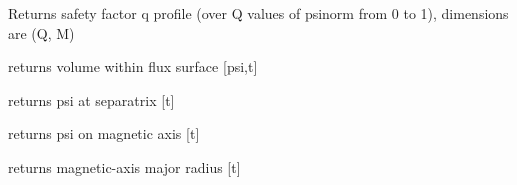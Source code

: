 \documentclass[letterpaper,10pt,english]{sphinxmanual}
\begin{document}
\begin{fulllineitems}
\begin{fulllineitems}
\end{fulllineitems}


\begin{fulllineitems}
\label{eqtools:eqtools.FromArrays.ArrayEquilibrium.getQProfile}
Returns safety factor q profile (over Q values of psinorm from 0 to 1), dimensions are (Q, M)

\end{fulllineitems}


\begin{fulllineitems}
\label{eqtools:eqtools.FromArrays.ArrayEquilibrium.getFluxVol}
returns volume within flux surface {[}psi,t{]}

\end{fulllineitems}


\begin{fulllineitems}
\label{eqtools:eqtools.FromArrays.ArrayEquilibrium.getFluxLCFS}
returns psi at separatrix {[}t{]}

\end{fulllineitems}


\begin{fulllineitems}
\label{eqtools:eqtools.FromArrays.ArrayEquilibrium.getFluxAxis}
returns psi on magnetic axis {[}t{]}

\end{fulllineitems}


\begin{fulllineitems}
\label{eqtools:eqtools.FromArrays.ArrayEquilibrium.getMagR}
returns magnetic-axis major radius {[}t{]}

\end{fulllineitems}



\end{fulllineitems}
\end{document}
